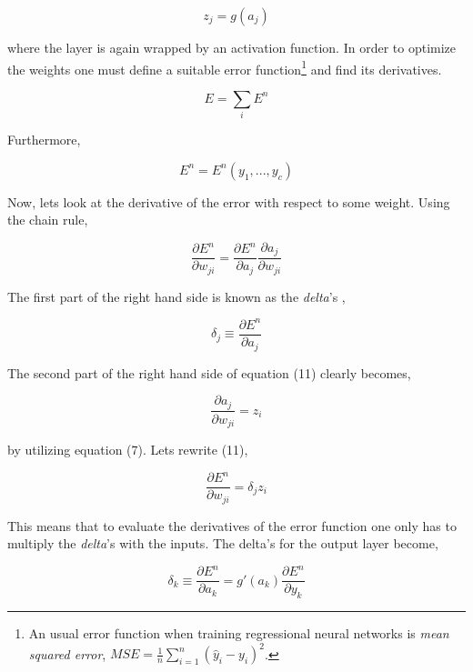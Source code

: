 \documentclass[12pt, letterpaper]{amsart}%
\begin{document}
\begin{equation}
    z_j = g(a_j)
\end{equation}

where the layer is again wrapped by an activation function. In order to optimize the weights one must define a suitable error function\footnote{An usual error function when training regressional neural networks is \textit{mean squared error}, $MSE = \frac{1}{n} \sum_{i=1}^n (\hat{y}_i - y_i)^2$.} and find its derivatives.

\begin{equation}
    E = \sum_i E^n
\end{equation}

Furthermore, 

\begin{equation}
    E^n = E^n(y_1,...,y_c)
\end{equation}

Now, lets look at the derivative of the error with respect to some weight. Using the chain rule,

\begin{equation}
    \frac{\partial E^n}{\partial w_{ji}} = \frac{\partial E^n}{\partial a_j} \frac{\partial a_j}{\partial w_{ji}}
\end{equation}

The first part of the right hand side is known as the \textit{delta}'s ,

\begin{equation}
    \delta_j \equiv \frac{\partial E^n}{\partial a_j}
\end{equation}

The second part of the right hand side of equation (11) clearly becomes,

\begin{equation}
    \frac{\partial a_j}{\partial w_{ji}} = z_i
\end{equation}

by utilizing equation (7). Lets rewrite (11),

\begin{equation}
    \frac{\partial E^n}{\partial w_{ji}} = \delta_j z_i
\end{equation}

This means that to evaluate the derivatives of the error function one only has to multiply the \textit{delta}'s with the inputs. The delta's for the output layer become,

\begin{equation}
    \delta_k \equiv \frac{\partial E^n}{\partial a_k} = g \prime (a_k) \frac{\partial E^n}{\partial y_k}
\end{equation}
\end{document}
